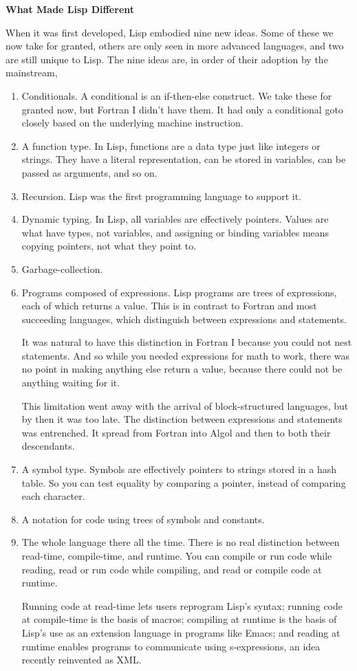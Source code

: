 \textbf{What Made Lisp Different}

When it was first developed, Lisp embodied nine new ideas. Some of these
we now take for granted, others are only seen in more advanced
languages, and two are still unique to Lisp. The nine ideas are, in
order of their adoption by the mainstream,

\begin{enumerate}
\def\labelenumi{\arabic{enumi}.}
\item
  Conditionals. A conditional is an if-then-else construct. We take
  these for granted now, but Fortran I didn't have them. It had only a
  conditional goto closely based on the underlying machine instruction.
\item
  A function type. In Lisp, functions are a data type just like integers
  or strings. They have a literal representation, can be stored in
  variables, can be passed as arguments, and so on.
\item
  Recursion. Lisp was the first programming language to support it.
\item
  Dynamic typing. In Lisp, all variables are effectively pointers.
  Values are what have types, not variables, and assigning or binding
  variables means copying pointers, not what they point to.
\item
  Garbage-collection.
\item
  Programs composed of expressions. Lisp programs are trees of
  expressions, each of which returns a value. This is in contrast to
  Fortran and most succeeding languages, which distinguish between
  expressions and statements.

  It was natural to have this distinction in Fortran I because you could
  not nest statements. And so while you needed expressions for math to
  work, there was no point in making anything else return a value,
  because there could not be anything waiting for it.

  This limitation went away with the arrival of block-structured
  languages, but by then it was too late. The distinction between
  expressions and statements was entrenched. It spread from Fortran into
  Algol and then to both their descendants.
\item
  A symbol type. Symbols are effectively pointers to strings stored in a
  hash table. So you can test equality by comparing a pointer, instead
  of comparing each character.
\item
  A notation for code using trees of symbols and constants.
\item
  The whole language there all the time. There is no real distinction
  between read-time, compile-time, and runtime. You can compile or run
  code while reading, read or run code while compiling, and read or
  compile code at runtime.

  Running code at read-time lets users reprogram Lisp's syntax; running
  code at compile-time is the basis of macros; compiling at runtime is
  the basis of Lisp's use as an extension language in programs like
  Emacs; and reading at runtime enables programs to communicate using
  s-expressions, an idea recently reinvented as XML.
\end{enumerate}

